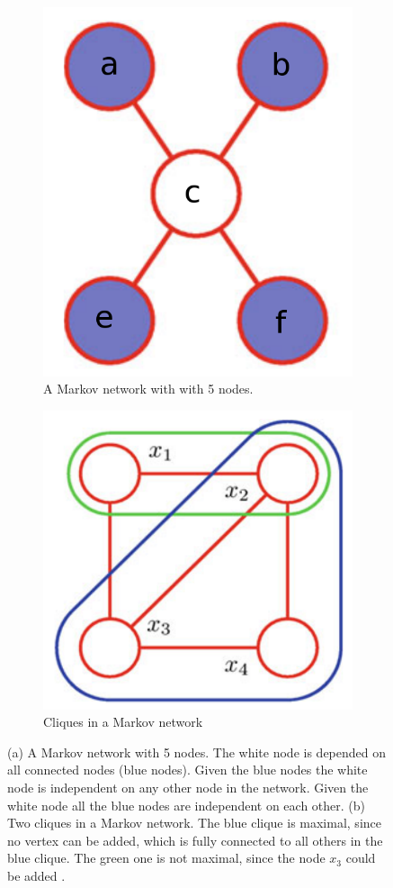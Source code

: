 \begin{figure}
	\centering
	\begin{subfigure}[t]{.5\textwidth}
  		\centering
  		\includegraphics[width=.5\linewidth]{imgs/markovnet1.png}
  		\caption{A Markov network with with 5 nodes.}
  		\label{fig:markovnet1}
	\end{subfigure}%
	\begin{subfigure}[t]{.5\textwidth}
  		\centering
  		\includegraphics[width=.5\linewidth]{imgs/markovnet2.png}
  		\caption{Cliques in a Markov network}
  		\label{fig:markovnet2}
	\end{subfigure}
	\caption{(a) A Markov network with 5 nodes. The white node is depended on all connected nodes (blue nodes). Given the blue nodes the white node is independent on any other node in the network. Given the white node all the blue nodes are independent on each other. (b) Two cliques in a Markov network. The blue clique is maximal, since no vertex can be added, which is fully connected to all others in the blue clique. The green one is not maximal, since the node $x_3$ could be added \cite{bishop2013pattern}.}
	\label{fig:markovnet}
\end{figure}


